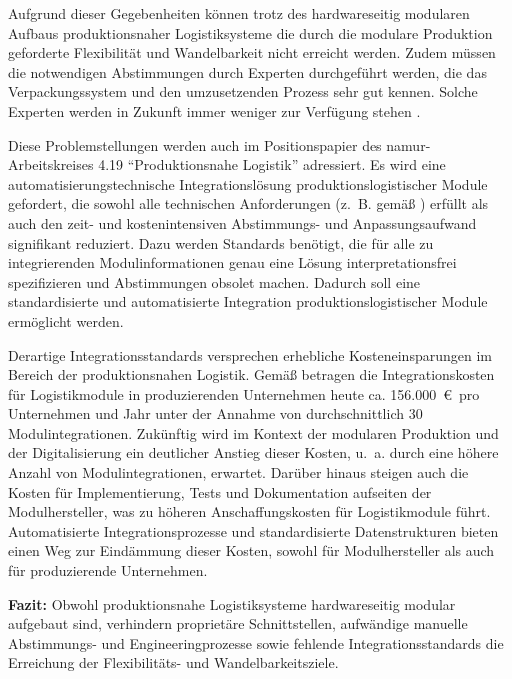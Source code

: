 Aufgrund dieser Gegebenheiten können trotz des hardwareseitig modularen Aufbaus produktionsnaher Logistiksysteme die durch die modulare Produktion geforderte Flexibilität und Wandelbarkeit nicht erreicht werden. Zudem müssen die notwendigen Abstimmungen durch Experten durchgeführt werden, die das Verpackungssystem und den umzusetzenden Prozess sehr gut kennen. Solche Experten werden in Zukunft immer weniger zur Verfügung stehen \cite{Pieringer.2025}. 

Diese Problemstellungen werden auch im Positionspapier \cite{NAMURAK4.19.2023} des \gls{namur}-Arbeitskreises 4.19 \enquote{Produktionsnahe Logistik} adressiert. Es wird eine automatisierungstechnische Integrationslösung produktionslogistischer Module gefordert, die sowohl alle technischen Anforderungen (z.~B. gemäß \cite{NAMURAK4.19.2020}) erfüllt als auch den zeit- und kostenintensiven Abstimmungs- und Anpassungsaufwand signifikant reduziert. Dazu werden Standards benötigt, die für alle zu integrierenden Modulinformationen genau eine Lösung interpretationsfrei spezifizieren und Abstimmungen obsolet machen. Dadurch soll eine standardisierte und automatisierte Integration produktionslogistischer Module ermöglicht werden. 

Derartige Integrationsstandards versprechen erhebliche Kosteneinsparungen im Bereich der produktionsnahen Logistik. Gemäß \cite{NAMURAK4.19.2023} betragen die Integrationskosten für Logistikmodule in produzierenden Unternehmen heute ca. 156.000~\euro~pro Unternehmen und Jahr unter der Annahme von durchschnittlich 30 Modulintegrationen. Zukünftig wird im Kontext der modularen Produktion und der Digitalisierung ein deutlicher Anstieg dieser Kosten, u.~a. durch eine höhere Anzahl von Modulintegrationen, erwartet. Darüber hinaus steigen auch die Kosten für Implementierung, Tests und Dokumentation aufseiten der Modulhersteller, was zu höheren Anschaffungskosten für Logistikmodule führt. Automatisierte Integrationsprozesse und standardisierte Datenstrukturen bieten einen Weg zur Eindämmung dieser Kosten, sowohl für Modulhersteller als auch für produzierende Unternehmen. \cite{NAMURAK4.19.2023}

\begin{graybox}
	\textbf{Fazit:}	Obwohl produktionsnahe Logistiksysteme hardwareseitig modular aufgebaut sind, verhindern proprietäre Schnittstellen, aufwändige manuelle Abstimmungs- und Engineeringprozesse sowie fehlende Integrationsstandards die Erreichung der Flexibilitäts- und Wandelbarkeitsziele.
\end{graybox}


